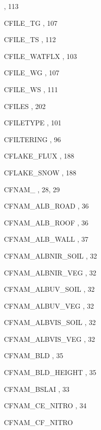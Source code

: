 \begin{theindex}
    \subitem {},  113
  \item CFILE\_TG
    \subitem {},  107
  \item CFILE\_TS
    \subitem {},  112
  \item CFILE\_WATFLX
    \subitem {},  103
  \item CFILE\_WG
    \subitem {},  107
  \item CFILE\_WS
    \subitem {},  111
  \item CFILES
    \subitem {},  202
  \item CFILETYPE
    \subitem {},  101
  \item CFILTERING
    \subitem {},  96
  \item CFLAKE\_FLUX
    \subitem {},  188
  \item CFLAKE\_SNOW
    \subitem {},  188
  \item CFNAM\_
    \subitem {},  28, 29
  \item CFNAM\_ALB\_ROAD
    \subitem {},  36
  \item CFNAM\_ALB\_ROOF
    \subitem {},  36
  \item CFNAM\_ALB\_WALL
    \subitem {},  37
  \item CFNAM\_ALBNIR\_SOIL
    \subitem {},  32
  \item CFNAM\_ALBNIR\_VEG
    \subitem {},  32
  \item CFNAM\_ALBUV\_SOIL
    \subitem {},  32
  \item CFNAM\_ALBUV\_VEG
    \subitem {},  32
  \item CFNAM\_ALBVIS\_SOIL
    \subitem {},  32
  \item CFNAM\_ALBVIS\_VEG
    \subitem {},  32
  \item CFNAM\_BLD
    \subitem {},  35
  \item CFNAM\_BLD\_HEIGHT
    \subitem {},  35
  \item CFNAM\_BSLAI
    \subitem {},  33
  \item CFNAM\_CE\_NITRO
    \subitem {},  34
  \item CFNAM\_CF\_NITRO

\end{theindex}
